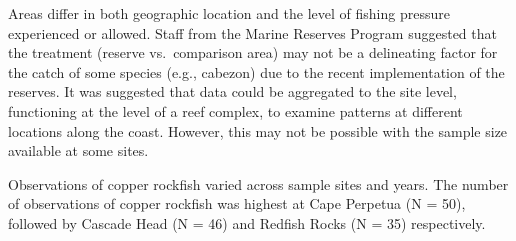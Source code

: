 \documentclass[11pt,
  english,
  a4paper,
]{article}
\begin{document}

Areas differ in both geographic location and the level of fishing pressure experienced or allowed. Staff from the Marine Reserves Program suggested that the treatment (reserve vs.~comparison area) may not be a delineating factor for the catch of some species (e.g., cabezon) due to the recent implementation of the reserves. It was suggested that data could be aggregated to the site level, functioning at the level of a reef complex, to examine patterns at different locations along the coast. However, this may not be possible with the sample size available at some sites.

\leavevmode\tagmcend\tagstructend\par


Observations of copper rockfish varied across sample sites and years. The number of observations of copper rockfish was highest at Cape Perpetua (N = 50), followed by Cascade Head (N = 46) and Redfish Rocks (N = 35) respectively.

\leavevmode\tagmcend\tagstructend\par

\begingroup\fontsize{10}{12}\selectfont
\begingroup\fontsize{10}{12}\selectfont
\end{document}
